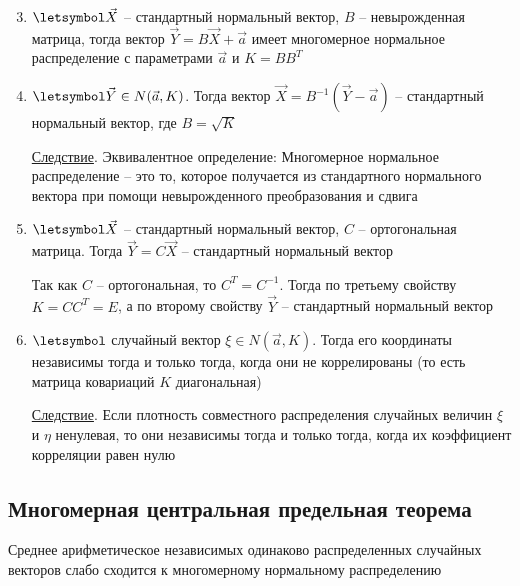\begin{enumerate}
    \setcounter{enumi}{2}

    \item $\letsymbol \vec X$ -- стандартный нормальный вектор, $B$ -- невырожденная матрица, 
    тогда вектор $\vec Y = B \vec X + \vec a$ имеет многомерное нормальное распределение с параметрами $\vec a$ и $K = B B^T$

    \item $\letsymbol \vec Y \in N(\vec a, K)$. Тогда вектор $\vec X = B^{-1} (\vec Y - \vec a)$ -- стандартный нормальный вектор, где $B = \sqrt{K}$

    \underline{Следствие}. Эквивалентное определение: Многомерное нормальное распределение -- это то, которое получается из
    стандартного нормального вектора при помощи невырожденного преобразования и сдвига

    \item $\letsymbol \vec X$ -- стандартный нормальный вектор, $C$ -- ортогональная матрица. Тогда $\vec Y = C \vec X$ -- стандартный нормальный вектор

    \begin{MyProof}
        Так как $C$ -- ортогональная, то $C^T = C^{-1}$. Тогда по третьему свойству $K = C C^T = E$, а по второму свойству $\vec Y$ -- стандартный нормальный вектор
    \end{MyProof}

    \item $\letsymbol$ случайный вектор $\xi \in N(\vec a, K)$.
    Тогда его координаты независимы тогда и только тогда, когда они не коррелированы (то есть матрица ковариаций $K$ диагональная)

    \underline{Следствие}. Если плотность совместного распределения случайных величин $\xi$ и $\eta$ ненулевая, то они независимы тогда и только тогда, 
    когда их коэффициент корреляции равен нулю
\end{enumerate}

\subsection{Многомерная центральная предельная теорема}

\begin{MyTheorem} 
    \Ths Среднее арифметическое независимых одинаково распределенных случайных векторов слабо сходится к многомерному нормальному распределению
\end{MyTheorem}

